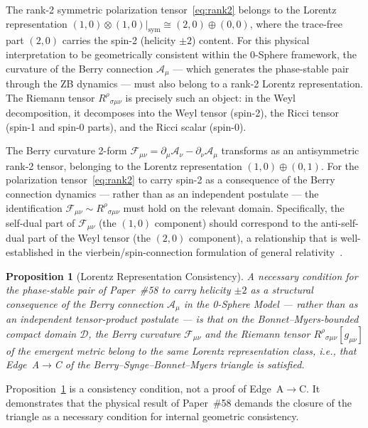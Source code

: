 \documentclass[%
 reprint, amsmath,amssymb, aps, prd, ]{revtex4-2}
\numberwithin{equation}{section}
\newtheorem{proposition}[theorem]{Proposition}
\newcommand{\BerryA}{\mathcal{A}}
\newcommand{\BerryF}{\mathcal{F}}
\begin{document}
The rank-2 symmetric polarization tensor~\eqref{eq:rank2} belongs to the Lorentz representation $(1,0) \otimes (1,0)|_\mathrm{sym} \cong (2,0) \oplus (0,0)$, where the trace-free part $(2,0)$ carries the spin-2 (helicity $\pm 2$) content.
For this physical interpretation to be geometrically consistent within the 0-Sphere framework, the curvature of the Berry connection $\BerryA_\mu$ --- which generates the phase-stable pair through the ZB dynamics --- must also belong to a rank-2 Lorentz representation.
The Riemann tensor $R^\rho{}_{\sigma\mu\nu}$ is precisely such an object: in the Weyl decomposition, it decomposes into the Weyl tensor (spin-2), the Ricci tensor (spin-1 and spin-0 parts), and the Ricci scalar (spin-0).

The Berry curvature 2-form $\BerryF_{\mu\nu} = \partial_\mu \BerryA_\nu - \partial_\nu \BerryA_\mu$ transforms as an antisymmetric rank-2 tensor, belonging to the Lorentz representation $(1,0) \oplus (0,1)$.
For the polarization tensor~\eqref{eq:rank2} to carry spin-2 as a consequence of the Berry connection dynamics --- rather than as an independent postulate --- the identification $\BerryF_{\mu\nu} \sim R^\rho{}_{\sigma\mu\nu}$ must hold on the relevant domain.
Specifically, the self-dual part of $\BerryF_{\mu\nu}$ (the $(1,0)$ component) should correspond to the anti-self-dual part of the Weyl tensor (the $(2,0)$ component), a relationship that is well-established in the vierbein/spin-connection formulation of general relativity~\cite{MTW1973,Nakahara2003}.

\begin{proposition}[Lorentz Representation Consistency]
\label{prop:lorentz}
A necessary condition for the phase-stable pair of Paper~\#58 to carry helicity $\pm 2$ as a structural consequence of the Berry connection $\BerryA_\mu$ in the 0-Sphere Model --- rather than as an independent tensor-product postulate --- is that on the Bonnet--Myers-bounded compact domain $\mathcal{D}$, the Berry curvature $\BerryF_{\mu\nu}$ and the Riemann tensor $R^\rho{}_{\sigma\mu\nu}[g_{\mu\nu}]$ of the emergent metric belong to the same Lorentz representation class, i.e., that Edge~A$\to$C of the Berry--Synge--Bonnet--Myers triangle is satisfied.
\end{proposition}

Proposition~\ref{prop:lorentz} is a consistency condition, not a proof of Edge~A$\to$C.
It demonstrates that the physical result of Paper~\#58 demands the closure of the triangle as a necessary condition for internal geometric consistency.
\end{document}
